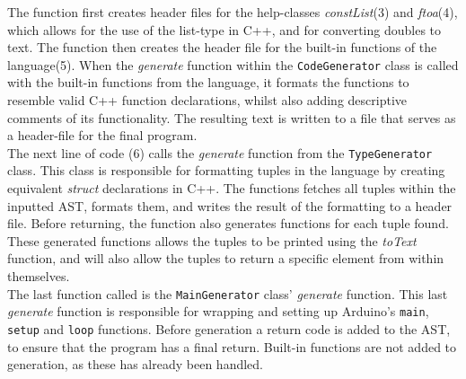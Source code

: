 The function first creates header files for the help-classes \textit{constList}(3) and \textit{ftoa}(4), which allows for the use of the list-type in C++, and for converting doubles to text. 
The function then creates the header file for the built-in functions of the language(5).
When the \textit{generate} function within the \texttt{CodeGenerator} class is called with the built-in functions from the language, it formats the functions to resemble valid C++ function declarations, whilst also adding descriptive comments of its functionality.
The resulting text is written to a file that serves as a header-file for the final program. \\
The next line of code (6) calls the \textit{generate} function from the \texttt{TypeGenerator} class.
This class is responsible for formatting tuples in the language by creating equivalent \textit{struct} declarations in C++.
The functions fetches all tuples within the inputted AST, formats them, and writes the result of the formatting to a header file.
Before returning, the function also generates functions for each tuple found.
These generated functions allows the tuples to be printed using the \textit{toText} function, and will also allow the tuples to return a specific element from within themselves.\\
The last function called is the \texttt{MainGenerator} class' \textit{generate} function. 
This last \textit{generate} function is responsible for wrapping and setting up Arduino's \texttt{main}, \texttt{setup} and \texttt{loop} functions.
Before generation a return code is added to the AST, to ensure that the program has a final return.
Built-in functions are not added to generation, as these has already been handled. 

